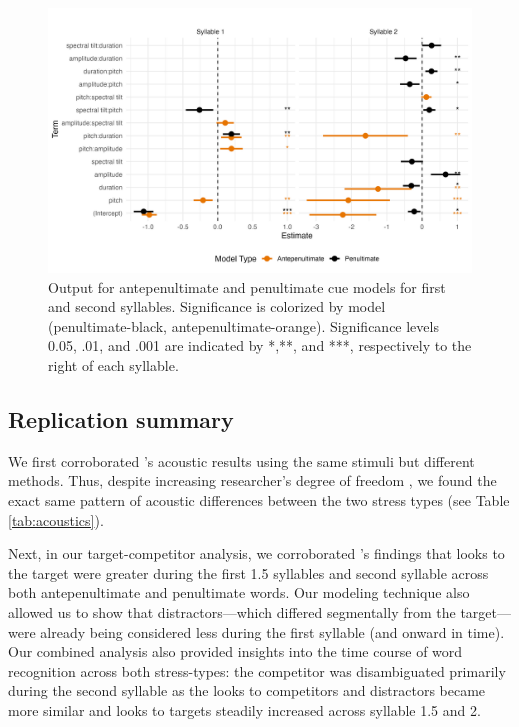\begin{figure}[H]
  \centering
  \includegraphics[width=1\linewidth]{visuals/analysis_3_plot.jpeg} %
  \caption{Output for antepenultimate and penultimate cue models for first and second syllables. Significance is colorized by model (penultimate-black, antepenultimate-orange). Significance levels 0.05, .01, and .001 are indicated by *,**, and ***, respectively to the right of each syllable.}
  \label{fig:analysis_3_plot }
\end{figure}

\subsection{Replication summary}
We first corroborated \cite{Sulpizio_McQueen_2012}'s acoustic results using the same stimuli but different methods. Thus, despite increasing researcher's degree of freedom \citep{Corretta2023}, we found the exact same pattern of acoustic differences between the two stress types (see Table \ref{tab:acoustics}).

Next, in our target-competitor analysis, we corroborated \cite{Sulpizio_McQueen_2012}'s findings that looks to the target were greater during the first 1.5 syllables and second syllable across both antepenultimate and penultimate words. Our modeling technique also allowed us to show that distractors---which differed segmentally from the target---were already being considered less during the first syllable (and onward in time). Our combined analysis also provided insights into the time course of word recognition across both stress-types: the competitor was disambiguated primarily during the second syllable as the looks to competitors and distractors became more similar and looks to targets steadily increased across syllable 1.5 and 2.

